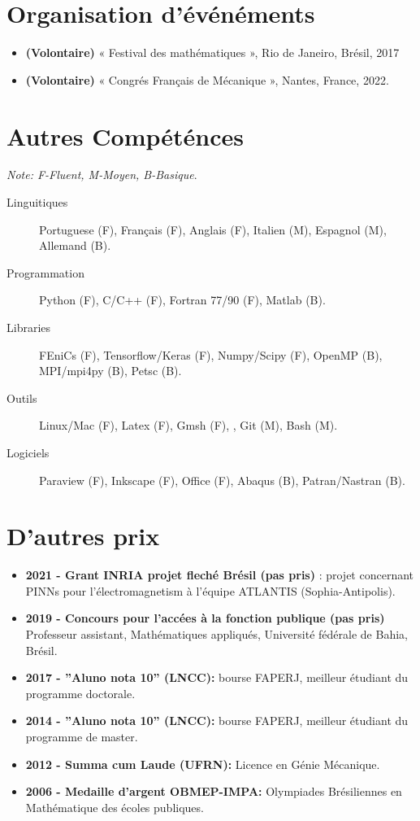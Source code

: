 \documentclass[french]{article}
\begin{document}
\section*{Organisation d'événéments}
\begin{itemize}
\item \textbf{(Volontaire)} « Festival des mathématiques », Rio de Janeiro, Brésil, 2017
\item \textbf{(Volontaire)} « Congrés Français de Mécanique », Nantes, France, 2022.
\end{itemize}

\section*{Autres Compéténces}
\textit{Note: F-Fluent, M-Moyen, B-Basique}. 
\begin{description}
\item[Linguitiques] Portuguese (F), Français (F), Anglais (F), Italien (M), Espagnol (M), Allemand (B).
\item[Programmation] Python (F), C/C++ (F), Fortran 77/90 (F), Matlab (B).
\item[Libraries] FEniCs (F), Tensorflow/Keras (F), Numpy/Scipy (F), OpenMP (B), MPI/mpi4py (B), Petsc (B). 
\item[Outils] Linux/Mac (F), Latex (F), Gmsh (F), , Git (M), Bash (M). 
\item[Logiciels] Paraview (F), Inkscape (F), Office (F), Abaqus (B), Patran/Nastran (B).
\end{description}

\section*{D'autres prix}
\begin{itemize}
\item \textbf{2021 - Grant INRIA projet fleché Brésil (pas pris)} : projet concernant PINNs pour l'électromagnetism à l'équipe ATLANTIS (Sophia-Antipolis).
\item \textbf{2019 - Concours pour l'accées à la fonction publique (pas pris)} Professeur assistant, Mathématiques appliqués, Université fédérale de Bahia, Brésil.
\item \textbf{2017 - ''Aluno nota 10'' (LNCC):} bourse FAPERJ, meilleur étudiant du programme doctorale.
\item \textbf{2014 - ''Aluno nota 10'' (LNCC):} bourse FAPERJ, meilleur étudiant du programme de master.
\item \textbf{2012 - Summa cum Laude (UFRN): } Licence en Génie Mécanique.
\item \textbf{2006 - Medaille d'argent OBMEP-IMPA:} Olympiades Brésiliennes en Mathématique des écoles publiques.
\end{itemize}
\end{document}
